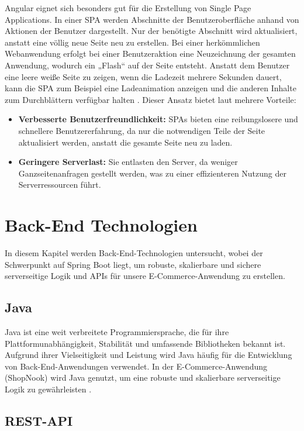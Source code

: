 Angular eignet sich besonders gut für die Erstellung von Single Page Applications. In einer SPA werden Abschnitte der Benutzeroberfläche anhand von Aktionen der Benutzer dargestellt. Nur der benötigte Abschnitt wird aktualisiert, anstatt eine völlig neue Seite neu zu erstellen. Bei einer herkömmlichen Webanwendung erfolgt bei einer Benutzeraktion eine Neuzeichnung der gesamten Anwendung, wodurch ein „Flash“ auf der Seite entsteht. Anstatt dem Benutzer eine leere weiße Seite zu zeigen, wenn die Ladezeit mehrere Sekunden dauert, kann die SPA zum Beispiel eine Ladeanimation anzeigen und die anderen Inhalte zum Durchblättern verfügbar halten \cite[S.11]{schmiedehausen2018single}.
Dieser Ansatz bietet laut \cite{Angular3:2024} mehrere Vorteile:
\begin{itemize}
	\item \textbf{Verbesserte Benutzerfreundlichkeit:} SPAs bieten eine reibungslosere und schnellere Benutzererfahrung, da nur die notwendigen Teile der Seite aktualisiert werden, anstatt die gesamte Seite neu zu laden.
	\item \textbf{Geringere Serverlast:} Sie entlasten den Server, da weniger Ganzseitenanfragen gestellt werden, was zu einer effizienteren Nutzung der Serverressourcen führt.
\end{itemize}

\section{Back-End Technologien}

In diesem Kapitel werden Back-End-Technologien untersucht, wobei der Schwerpunkt auf Spring Boot liegt, um robuste, skalierbare und sichere serverseitige Logik und APIs für unsere E-Commerce-Anwendung zu erstellen.

\subsection{Java}

Java ist eine weit verbreitete Programmiersprache, die für ihre Plattformunabhängigkeit, Stabilität und umfassende Bibliotheken bekannt ist. Aufgrund ihrer Vielseitigkeit und Leistung wird Java häufig für die Entwicklung von Back-End-Anwendungen verwendet. In der E-Commerce-Anwendung (ShopNook) wird Java genutzt, um eine robuste und skalierbare serverseitige Logik zu gewährleisten  \cite{Java:2024}.

\subsection{REST-API}

